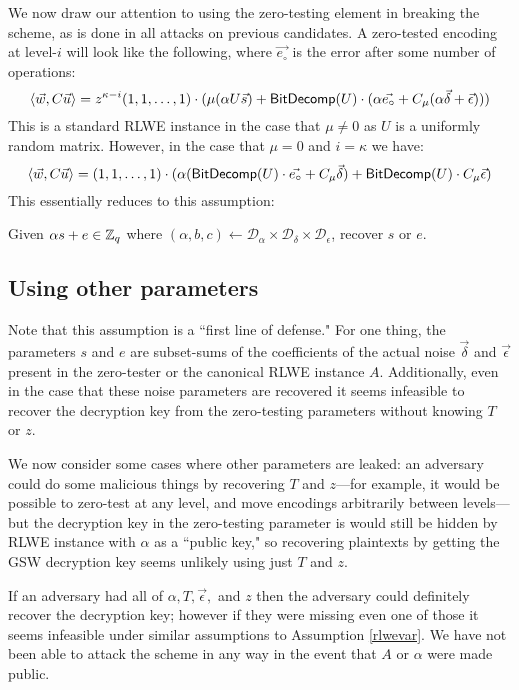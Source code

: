 We now draw our attention to using the zero-testing element in breaking the scheme, as is done in all attacks on previous candidates.  A zero-tested encoding at level-$i$ will look like the following, where $\vec{e_{\circ}}$ is the error after some number of operations:
$$\left<\vec{w}, C \vec{u}\right> = z^{\kappa-i}(1,1,\ldots,1)\cdot(\mu(\alpha U \vec{s}) + \mathsf{BitDecomp}(U)\cdot (\alpha\vec{e_\circ} + C_\mu(\alpha\vec{\delta} + \vec{\epsilon})))$$
This is a standard RLWE instance in the case that $\mu \not= 0$ as $U$ is a uniformly random matrix.  However, in the case that $\mu = 0$ and $i = \kappa$ we have:
\begin{equation}\label{eq:topleveltested}
\left<\vec{w}, C \vec{u}\right> = (1,1,\ldots,1)\cdot(\alpha (\mathsf{BitDecomp}(U)\cdot \vec{e_\circ} + C_\mu\vec{\delta}) + \mathsf{BitDecomp}(U)\cdot C_\mu\vec{\epsilon})
\end{equation}
This essentially reduces to this assumption:
\begin{assumption}
\label{rlwevar}
Given $\alpha s + e \in \mathbb{Z}_q$ where $(\alpha, b, c) \leftarrow \mathcal{D}_\alpha \times \mathcal{D}_\delta \times \mathcal{D}_\epsilon$, recover $s$ or $e$.
\end{assumption}

\subsection{Using other parameters}
Note that this assumption is a ``first line of defense."  For one thing, the parameters $s$ and $e$ are subset-sums of the coefficients of the actual noise $\vec{\delta}$ and $\vec{\epsilon}$ present in the zero-tester or the canonical RLWE instance $A$. Additionally, even in the case that these noise parameters are recovered it seems infeasible to recover the decryption key from the zero-testing parameters without knowing $T$ or $z$.  

We now consider some cases where other parameters are leaked:  an adversary could do some malicious things by recovering $T$ and $z$---for example, it would be possible to zero-test at any level, and move encodings arbitrarily between levels---but the decryption key in the zero-testing parameter is would still be hidden by RLWE instance with $\alpha$ as a ``public key," so recovering plaintexts by getting the GSW decryption key seems unlikely using just $T$ and $z$.  

If an adversary had all of $\alpha, T, \vec{\epsilon},$ and $z$ then the adversary could definitely recover the decryption key; however if they were missing even one of those it seems infeasible under similar assumptions to Assumption \ref{rlwevar}.  We have not been able to attack the scheme in any way in the event that $A$ or $\alpha$ were made public.

